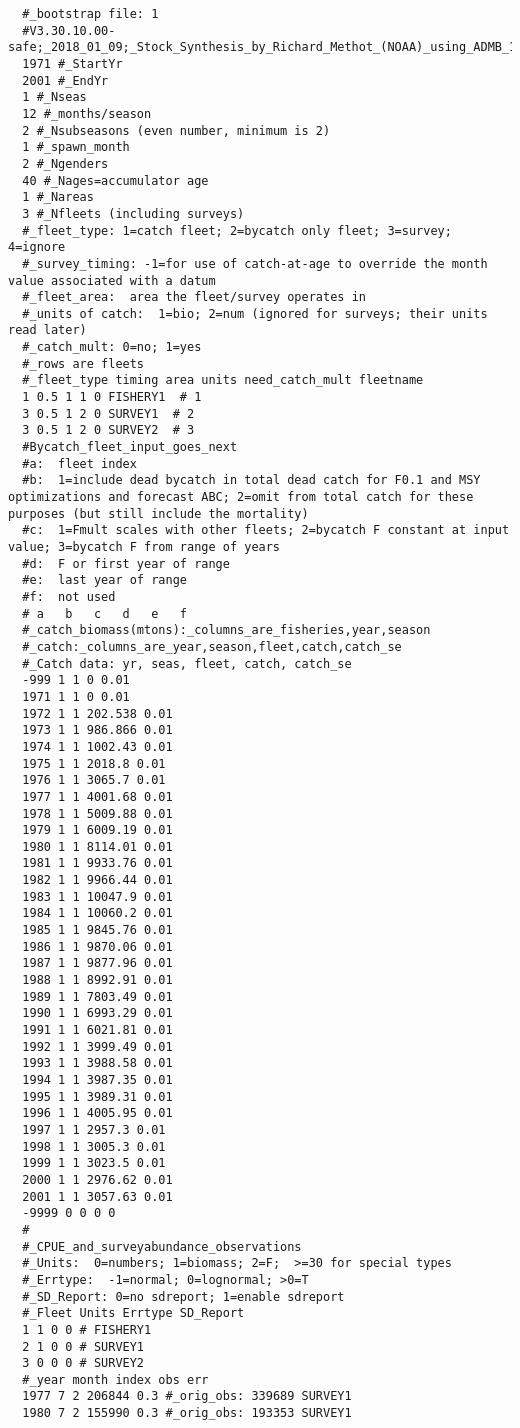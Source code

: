 \begin{landscape}
{\begin{verbatim}
  #_bootstrap file: 1
  #V3.30.10.00-safe;_2018_01_09;_Stock_Synthesis_by_Richard_Methot_(NOAA)_using_ADMB_11.6
  1971 #_StartYr
  2001 #_EndYr
  1 #_Nseas
  12 #_months/season
  2 #_Nsubseasons (even number, minimum is 2)
  1 #_spawn_month
  2 #_Ngenders
  40 #_Nages=accumulator age
  1 #_Nareas
  3 #_Nfleets (including surveys)
  #_fleet_type: 1=catch fleet; 2=bycatch only fleet; 3=survey; 4=ignore 
  #_survey_timing: -1=for use of catch-at-age to override the month value associated with a datum 
  #_fleet_area:  area the fleet/survey operates in 
  #_units of catch:  1=bio; 2=num (ignored for surveys; their units read later)
  #_catch_mult: 0=no; 1=yes
  #_rows are fleets
  #_fleet_type timing area units need_catch_mult fleetname
  1 0.5 1 1 0 FISHERY1  # 1
  3 0.5 1 2 0 SURVEY1  # 2
  3 0.5 1 2 0 SURVEY2  # 3
  #Bycatch_fleet_input_goes_next
  #a:  fleet index
  #b:  1=include dead bycatch in total dead catch for F0.1 and MSY optimizations and forecast ABC; 2=omit from total catch for these purposes (but still include the mortality)
  #c:  1=Fmult scales with other fleets; 2=bycatch F constant at input value; 3=bycatch F from range of years
  #d:  F or first year of range
  #e:  last year of range
  #f:  not used
  # a   b   c   d   e   f 
  #_catch_biomass(mtons):_columns_are_fisheries,year,season
  #_catch:_columns_are_year,season,fleet,catch,catch_se
  #_Catch data: yr, seas, fleet, catch, catch_se
  -999 1 1 0 0.01
  1971 1 1 0 0.01
  1972 1 1 202.538 0.01
  1973 1 1 986.866 0.01
  1974 1 1 1002.43 0.01
  1975 1 1 2018.8 0.01
  1976 1 1 3065.7 0.01
  1977 1 1 4001.68 0.01
  1978 1 1 5009.88 0.01
  1979 1 1 6009.19 0.01
  1980 1 1 8114.01 0.01
  1981 1 1 9933.76 0.01
  1982 1 1 9966.44 0.01
  1983 1 1 10047.9 0.01
  1984 1 1 10060.2 0.01
  1985 1 1 9845.76 0.01
  1986 1 1 9870.06 0.01
  1987 1 1 9877.96 0.01
  1988 1 1 8992.91 0.01
  1989 1 1 7803.49 0.01
  1990 1 1 6993.29 0.01
  1991 1 1 6021.81 0.01
  1992 1 1 3999.49 0.01
  1993 1 1 3988.58 0.01
  1994 1 1 3987.35 0.01
  1995 1 1 3989.31 0.01
  1996 1 1 4005.95 0.01
  1997 1 1 2957.3 0.01
  1998 1 1 3005.3 0.01
  1999 1 1 3023.5 0.01
  2000 1 1 2976.62 0.01
  2001 1 1 3057.63 0.01
  -9999 0 0 0 0
  #
  #_CPUE_and_surveyabundance_observations
  #_Units:  0=numbers; 1=biomass; 2=F;  >=30 for special types
  #_Errtype:  -1=normal; 0=lognormal; >0=T
  #_SD_Report: 0=no sdreport; 1=enable sdreport
  #_Fleet Units Errtype SD_Report
  1 1 0 0 # FISHERY1
  2 1 0 0 # SURVEY1
  3 0 0 0 # SURVEY2
  #_year month index obs err
  1977 7 2 206844 0.3 #_orig_obs: 339689 SURVEY1
  1980 7 2 155990 0.3 #_orig_obs: 193353 SURVEY1

\end{verbatim}}
\end{landscape}
